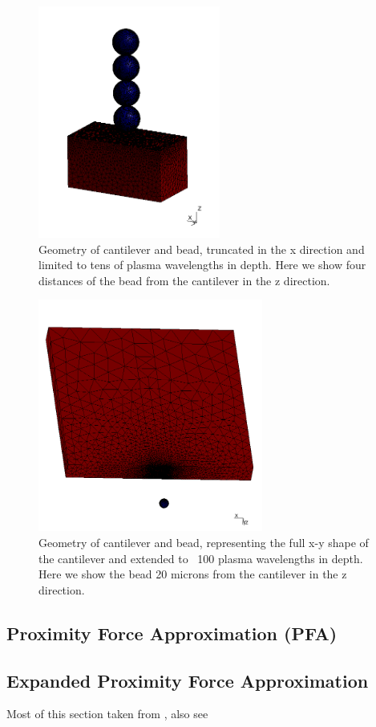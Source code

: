 \documentclass[11pt]{article}
\begin{document}
\begin{figure}[!h]
\centering
\includegraphics[height=3in]{geometry}
\caption{Geometry of cantilever and bead, truncated in the x direction and limited to tens of plasma wavelengths in depth. Here we show four distances of the bead from the cantilever in the z direction.}\label{fig:geo}
\end{figure}

\begin{figure}[!h]
\centering
\includegraphics[height=3in]{Bead_positions}
\caption{Geometry of cantilever and bead, representing the full x-y shape of the cantilever and extended to ~100 plasma wavelengths in depth. Here we show the bead 20 microns from the cantilever in the z direction.}\label{fig:geo}
\end{figure}

\subsection{Proximity Force Approximation (PFA)}

\subsection{Expanded Proximity Force Approximation}
Most of this section taken from \citet{Dexp}, also see \citet{Bimonte12}
\end{document}
